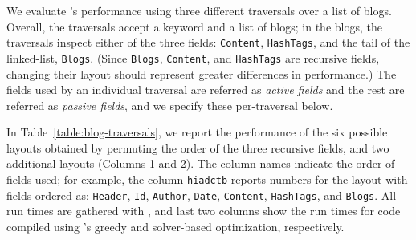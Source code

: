 We evaluate \system{}'s performance using three different traversals over a list of blogs.
%
Overall, the traversals accept a keyword and a list of blogs; in the
blogs, the traversals inspect either of the three fields: \lstinline{Content},
\lstinline{HashTags}, and the tail of the linked-list, \lstinline{Blogs}.
(Since \lstinline{Blogs}, \lstinline{Content}, and \lstinline{HashTags} are
recursive fields, changing their layout should represent greater differences in performance.)
%
The fields used by an individual traversal are referred as {\em active fields}
and the rest are referred as {\em passive fields}, and we specify these per-traversal below.

In Table~\ref{table:blog-traversals}, we report the performance of the six
possible layouts obtained by permuting the order of the three recursive fields,
and two additional layouts (Columns 1 and 2).
%
The column names indicate the order of fields used;
%
for example, the column \lstinline{hiadctb} reports numbers for the layout with fields ordered as:
\lstinline{Header}, \lstinline{Id}, \lstinline{Author}, \lstinline{Date}, \lstinline{Content}, \lstinline{HashTags}, and \lstinline{Blogs}.
%
All run times are gathered with \gibbon{}, and
%
last two columns show the run times for code compiled using \system's greedy
and solver-based optimization, respectively.
%
%


